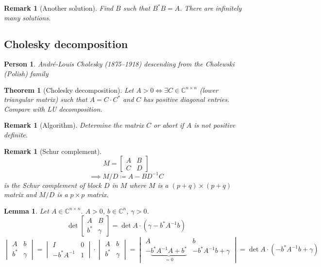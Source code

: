 \documentclass{article}
\newcounter{lecref}[section]
\numberwithin{lecref}{section}
\newtheorem{theorem}[lecref]{Theorem}
\newtheorem{lemma}[lecref]{Lemma}
\newtheorem{remark}[lecref]{Remark}
\newtheorem*{person}{Person}
\begin{document}
\begin{remark}[Another solution]
  Find $B$ such that $B^* B = A$. There are infinitely many solutions.
\end{remark}

\subsection{Cholesky decomposition}

\begin{person}
  Andr\'e-Louis Cholesky (1875--1918) descending from the Cholewski (Polish) family
\end{person}

\begin{theorem}[Cholesky decomposition] %
  Let $A > 0 \iff \exists C \in \mathbb C^{n \times n}$ (lower triangular matrix) such that $A = C \cdot C^*$ and $C$ has positive diagonal entries.
  Compare with LU decomposition.
\end{theorem}

\begin{remark}[Algorithm]
  Determine the matrix $C$ or abort if $A$ is not positive definite.
\end{remark}

\begin{remark}[Schur complement]
  \[ M = \begin{bmatrix} A & B \\ C & D \end{bmatrix} \]
  \[ \implies M/D \coloneqq A - BD^{-1} C \]
  is the Schur complement of block $D$ in $M$ where $M$ is a $(p + q) \times (p + q)$ matrix and $M/D$ is a $p\times p$ matrix.
\end{remark}

\begin{lemma} %
  Let $A \in \mathbb C^{n \times n}$. $A > 0$, $b \in \mathbb C^n$, $\gamma > 0$.
  \[ \det\left[\begin{array}{c|c}A & B \\ \hline b^* & \gamma \end{array}\right] = \det A \cdot (\gamma - b^* A^{-1} b)  \]
  \[
    \begin{vmatrix} A & b \\ b^* & \gamma \end{vmatrix}
    = \begin{vmatrix} I & 0 \\ -b^* A^{-1} & 1 \end{vmatrix} \cdot \begin{vmatrix} A & b \\ b^* & \gamma \end{vmatrix}
    = \begin{vmatrix} A & b \\ -\underbrace{b^* A^{-1} A + b^*}_{=0} & -b^* A^{-1} b + \gamma \end{vmatrix}
    = \det{A} \cdot (-b^* A^{-1} b + \gamma)
  \]
\end{lemma}
\end{document}
